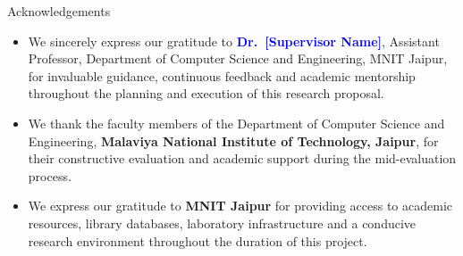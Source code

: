 \documentclass[aspectratio=169]{beamer}
\begin{document}
\begin{frame}{Acknowledgements}
\begin{itemize}
    \item We sincerely express our gratitude to
          \textbf{\textcolor{blue}{Dr.\ [Supervisor Name]}},
          Assistant Professor, Department of Computer Science and Engineering,
          MNIT Jaipur, for invaluable guidance, continuous feedback and academic
          mentorship throughout the planning and execution of this research proposal.

    \vspace{6pt}
    \item We thank the faculty members of the Department of Computer Science and
          Engineering, \textbf{Malaviya National Institute of Technology, Jaipur},
          for their constructive evaluation and academic support during the
          mid-evaluation process.

    \vspace{6pt}
    \item We express our gratitude to \textbf{MNIT Jaipur} for providing access to
          academic resources, library databases, laboratory infrastructure and a
          conducive research environment throughout the duration of this project.
\end{itemize}
\end{frame}
\end{document}
